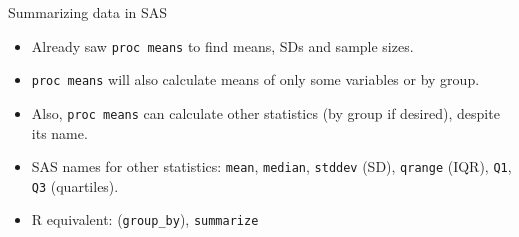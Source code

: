 \documentclass[unknownkeysallowed]{beamer}\usepackage[]{graphicx}\usepackage[]{color}
\begin{document}




\begin{frame}[fragile]{Summarizing data in SAS}
  
  \begin{itemize}
  \item Already saw \texttt{proc means} to find means, SDs and sample
    sizes.
  \item \texttt{proc means} will also calculate means of only some
    variables or by group.
  \item Also, \texttt{proc means} can calculate other statistics (by
    group if desired), despite its name.
  \item SAS names for other statistics: \texttt{mean},
    \texttt{median}, \texttt{stddev} (SD), \texttt{qrange} (IQR),
    \texttt{Q1}, \texttt{Q3} (quartiles).
  \item R equivalent: (\texttt{group\_by}), \texttt{summarize}
  \end{itemize}
  
\end{frame}
\end{document}
